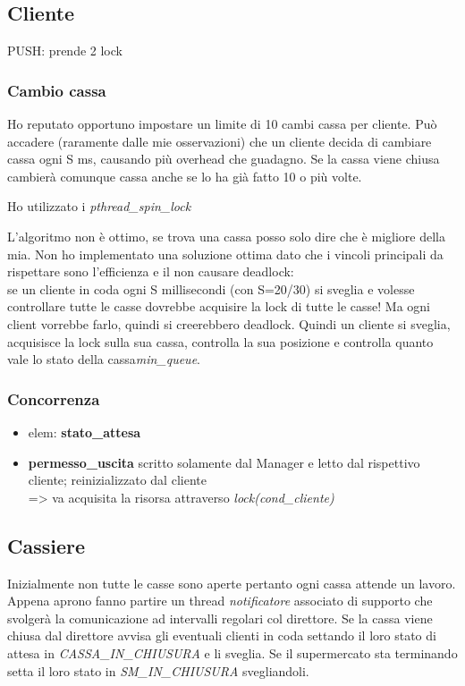 \documentclass[11pt, a4paper]{article}
\begin{document}
\subsection{Cliente}
PUSH: prende 2 lock
\subsubsection{Cambio cassa}
Ho reputato opportuno impostare un limite di 10 cambi cassa per cliente. Può accadere (raramente dalle mie osservazioni) che un cliente decida di cambiare cassa ogni S ms, causando più overhead che guadagno. Se la cassa viene chiusa cambierà comunque cassa anche se lo ha già fatto 10 o più volte.

Ho utilizzato i \textit{pthread\_spin\_lock}

L'algoritmo non è ottimo, se trova una cassa posso solo dire che è migliore della mia. Non ho implementato una soluzione ottima dato che i vincoli principali da rispettare sono l'efficienza e il non causare deadlock:\\
se un cliente in coda ogni S millisecondi (con S=20/30) si sveglia e volesse controllare tutte le casse dovrebbe acquisire la lock di tutte le casse! Ma ogni client vorrebbe farlo, quindi si creerebbero deadlock. 
Quindi un cliente si sveglia, acquisisce la lock sulla sua cassa, controlla la sua posizione e controlla quanto vale lo stato della cassa\textit{min\_queue}. 
\subsubsection{Concorrenza}
\begin{itemize}
\item elem: \textbf{stato\_attesa}
\item \textbf{permesso\_uscita} scritto solamente dal Manager e letto dal rispettivo cliente; reinizializzato dal cliente\\
=> \hspace{10mm} va acquisita la risorsa attraverso \textit{lock(cond\_cliente)} 

\end{itemize}


\subsection{Cassiere}
Inizialmente non tutte le casse sono aperte pertanto ogni cassa attende un lavoro. Appena aprono fanno partire un thread \textit{notificatore} associato di supporto che svolgerà la comunicazione ad intervalli regolari col direttore.
Se la cassa viene chiusa dal direttore avvisa gli eventuali clienti in coda settando il loro stato di attesa in \textit{CASSA\_IN\_CHIUSURA} e li sveglia. Se il supermercato sta terminando setta il loro stato in \textit{SM\_IN\_CHIUSURA} svegliandoli.
\end{document}
